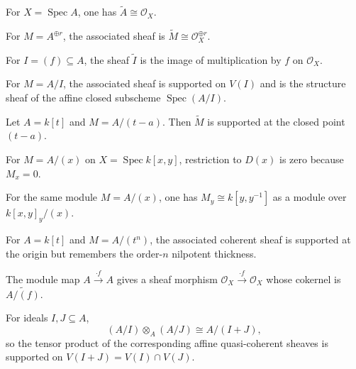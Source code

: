 \begin{example}
For $X=\operatorname{Spec}A$, one has $\widetilde A\cong\mathcal O_X$.
\end{example}

\begin{example}
For $M=A^{\oplus r}$, the associated sheaf is $\widetilde M\cong\mathcal O_X^{\oplus r}$.
\end{example}

\begin{example}
For $I=(f)\subseteq A$, the sheaf $\widetilde I$ is the image of multiplication by $f$ on $\mathcal O_X$.
\end{example}

\begin{example}
For $M=A/I$, the associated sheaf is supported on $V(I)$ and is the structure sheaf of the affine closed subscheme $\operatorname{Spec}(A/I)$.
\end{example}

\begin{example}
Let $A=k[t]$ and $M=A/(t-a)$.  Then $\widetilde M$ is supported at the closed point $(t-a)$.
\end{example}

\begin{example}[Localization]
For $M=A/(x)$ on $X=\operatorname{Spec}k[x,y]$, restriction to $D(x)$ is zero because $M_x=0$.
\end{example}

\begin{example}[Restriction to $D(y)$]
For the same module $M=A/(x)$, one has $M_y\cong k[y,y^{-1}]$ as a module over $k[x,y]_y/(x)$.
\end{example}

\begin{example}
For $A=k[t]$ and $M=A/(t^n)$, the associated coherent sheaf is supported at the origin but remembers the order-$n$ nilpotent thickness.
\end{example}

\begin{example}
The module map $A\xrightarrow{\cdot f}A$ gives a sheaf morphism $\mathcal O_X\xrightarrow{\cdot f}\mathcal O_X$ whose cokernel is $\widetilde{A/(f)}$.
\end{example}

\begin{example}
For ideals $I,J\subseteq A$,
\[
(A/I)\otimes_A(A/J)\cong A/(I+J),
\]
so the tensor product of the corresponding affine quasi-coherent sheaves is supported on $V(I+J)=V(I)\cap V(J)$.
\end{example}

